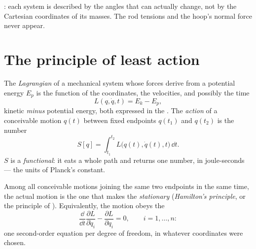 \begin{omfigure}
{\small {}: each system is described by the
angles that can actually change, not by the Cartesian coordinates of
its masses. The rod tensions and the hoop's normal force never appear.}
\end{omfigure}

\section{The principle of least action}

\begin{definition}\label{def:b3:lagrangian-mechanics:action}
The \emph{Lagrangian} of a mechanical system whose forces derive from a
potential energy $E_p$ is the function of the coordinates, the
velocities, and possibly the time
\[
L(q, \dot q, t) = E_k - E_p ,
\]
kinetic \emph{minus} potential energy, both expressed in the
. The \emph{action} of a conceivable motion
$q(t)$ between fixed endpoints $q(t_1)$ and $q(t_2)$ is the number
\[
S[q] = \int_{t_1}^{t_2} L\big(q(t), \dot q(t), t\big)\,\dd t .
\]
$S$ is a \emph{functional}: it eats a whole path and returns one
number, in joule-seconds --- the units of Planck's constant.
\end{definition}

\begin{theorem}\label{thm:b3:lagrangian-mechanics:euler-lagrange}
Among all conceivable motions joining the same two endpoints in the
same time, the actual motion is the one that makes the 
\emph{stationary} (\emph{Hamilton's principle}, or the principle of
\emph{}). Equivalently, the motion obeys the
\emph{}
\[
\frac{\dd}{\dd t}\frac{\partial L}{\partial\dot q_i}
 - \frac{\partial L}{\partial q_i} = 0 ,
\qquad i = 1, \dots, n :
\]
one second-order equation per degree of freedom, in whatever
coordinates were chosen.
\end{theorem}

